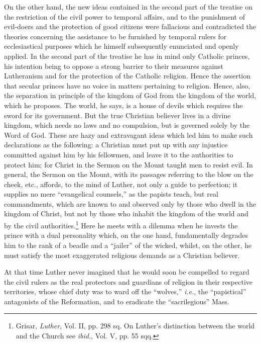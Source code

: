 On the other hand, the new ideas contained in the second part of
the treatise on the restriction of the civil power to temporal affairs,
and to the punishment of evil-doers and the protection of good
citizens were fallacious and contradicted the theories concerning
the assistance to be furnished by temporal rulers for ecclesiastical
purposes which he himself subsequently enunciated and openly applied.
In the second part of the treatise he has in mind only Catholic
princes, his intention being to oppose a strong barrier to their
measures against Lutheranism and for the protection of the Catholic
religion. Hence the assertion that secular princes have no voice in
matters pertaining to religion. Hence, also, the separation in principle
of the kingdom of God from the kingdom of the world, which he
proposes. The world, he says, is a house of devils which requires
the sword for its government. But the true Christian believer lives
in a divine kingdom, which needs no laws and no compulsion, but is
governed solely by the Word of God. These are hazy and extravagant
ideas which led him to make such declarations as the following:
a Christian must put up with any injustice committed against him
by his fellowmen, and leave it to the authorities to protect him;
for Christ in the Sermon on the Mount taught men to resist evil.
In general, the Sermon on the Mount, with its passages referring to
the blow on the cheek, etc., affords, to the mind of Luther, not
only a guide to perfection; it supplies no mere “evangelical counsels,”
as the papists teach, but real commandments, which are known to
and observed only by those who dwell in the kingdom of Christ,
but not by those who inhabit the kingdom of the world and by the
civil authorities.\footnote
{Grisar, \textit{Luther}, Vol. II, pp. 298 sq. On Luther’s distinction between the world and
the Church see \textit{ibid.}, Vol. V, pp. 55 sqq.}
Here he meets with a dilemma when he invests
the prince with a dual personality which, on the one hand, fundamentally
degrades him to the rank of a beadle and a “jailer” of the
wicked, whilst, on the other, he must satisfy the most exaggerated
religious demands as a Christian believer.

At that time Luther never imagined that he would soon be compelled to regard
the civil rulers as the real protectors and guardians
of religion in their respective territories, whose chief duty was to
ward off the “wolves,” \textit{i.e.}, the “papistical” antagonists of the
Reformation, and to eradicate the “sacrilegious” Mass.
